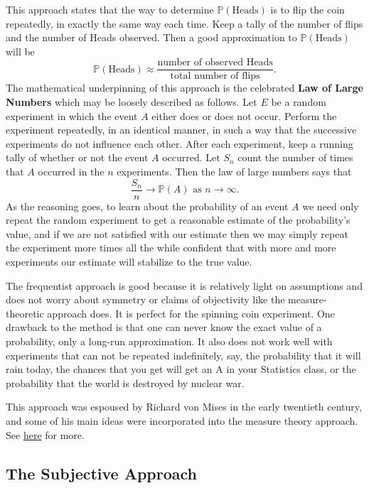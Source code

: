 \documentclass[captions=tableheading]{scrbook}
\begin{document}
This approach states that the way to determine \(\mathbb{P}(\mbox{Heads})\) is to flip the coin repeatedly, in exactly the same way each time. Keep a tally of the number of flips and the number of Heads observed. Then a good approximation to \(\mathbb{P}(\mbox{Heads})\) will be
\begin{equation} 
\mathbb{P}(\mbox{Heads})\approx\frac{\mbox{number of observed Heads}}{\mbox{total number of flips}}.
\end{equation}
The mathematical underpinning of this approach is the celebrated \textbf{Law of Large Numbers} which may be loosely described as follows. Let \(E\) be a random experiment in which the event \(A\) either does or does not occur. Perform the experiment repeatedly, in an identical manner, in such a way that the successive experiments do not influence each other. After each experiment, keep a running tally of whether or not the event \(A\) occurred. Let \(S_{n}\) count the number of times that \(A\) occurred in the \(n\) experiments. Then the law of large numbers says that 
\begin{equation}
\frac{S_{n}}{n}\to\mathbb{P}(A)\mbox{ as }n\to\infty.
\end{equation}
As the reasoning goes, to learn about the probability of an event \(A\) we need only repeat the random experiment to get a reasonable estimate of the probability's value, and if we are not satisfied with our estimate then we may simply repeat the experiment more times all the while confident that with more and more experiments our estimate will stabilize to the true value. 

The frequentist approach is good because it is relatively light on assumptions and does not worry about symmetry or claims of objectivity like the measure-theoretic approach does. It is perfect for the spinning coin experiment. One drawback to the method is that one can never know the exact value of a probability, only a long-run approximation. It also does not work well with experiments that can not be repeated indefinitely, say, the probability that it will rain today, the chances that you get will get an A in your Statistics class, or the probability that the world is destroyed by nuclear war.

This approach was espoused by Richard von Mises in the early twentieth century, and some of his main ideas were incorporated into the measure theory approach. See \href{http://www-history.mcs.st-andrews.ac.uk/Biographies/Mises.html}{here} for more.
\subsection{The Subjective Approach}
\label{sec-4-3-3}
\end{document}
